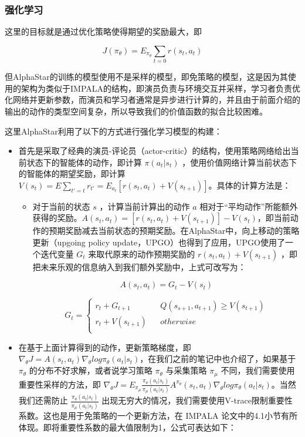 \subsubsection{强化学习} 

这里的目标就是通过优化策略使得期望的奖励最大，即

$$
J(\pi_{\theta}) = E_{\pi_{\theta}} \sum_{t=0}r(s_t,a_t)
$$

但AlphaStar的训练的模型使用不是采样的模型，即免策略的模型，这是因为其使用的架构为类似于IMPALA的结构，即演员负责与环境交互并采样，学习者负责优化网络并更新参数，而演员和学习者通常是异步进行计算的，并且由于前面介绍的输出的动作的类型空间复杂，所以导致我们的价值函数的拟合比较困难。

这里AlphaStar利用了以下的方式进行强化学习模型的构建：
\begin{itemize}
    \item 首先是采取了经典的演员-评论员（actor-critic）的结构，使用策略网络给出当前状态下的智能体的动作，即计算 $\pi(a_t|s_t)$ ，使用价值网络计算当前状态下的智能体的期望奖励，即计算 $V(s_t) = E \sum_{t'=t}r_{t'} = E_{a_t}[r(s_t,a_t)+V(s_{t+1})]$。具体的计算方法是：
    \begin{itemize}
        \item 对于当前的状态 $s$ ，计算当前计算出的动作 $a$ 相对于“平均动作”所能额外获得的奖励。$A(s_t,a_t)=[r(s_t,a_t)+V(s_{t+1})]-V(s_t)$，即当前动作的预期奖励减去当前状态的预期奖励。在AlphaStar中，向上移动的策略更新（upgoing policy update，UPGO）也得到了应用，UPGO使用了一个迭代变量 $G_t$ 来取代原来的动作预期奖励的 $r(s_t,a_t)+V(s_{t+1})$ ，即把未来乐观的信息纳入到我们额外奖励中，上式可改写为：

        $$
        A(s_t,a_t)=G_t-V(s_t)
        $$
        
        $$
        G_t=\left\{
        \begin{aligned}
        r_t+G_{t+1} && Q(s_{s+1},a_{t+1})\geq V(s_{t+1}) \\
        r_t+V(s_{t+1}) && otherwise \\
        \end{aligned}
        \right.
        $$
    \end{itemize}
\item 在基于上面计算得到的动作，更新策略梯度，即 $\nabla_{\theta}J = A(s_t,a_t)\nabla_{\theta}log \pi_{\theta}(a_t|s_t)$，在我们之前的笔记中也介绍了，如果基于 $\pi_{\theta}$ 的分布不好求解，或者说学习策略 $\pi_{\theta}$ 与采集策略 $\pi_{\mu}$ 不同，我们需要使用重要性采样的方法，即 $\nabla_{\theta}J = E_{\pi_{\mu}}\frac{\pi_{\theta} (a_t|s_t)}{\pi_{\mu} (a_t|s_t)} A^{\pi_{\theta}}(s_t,a_t)\nabla_{\theta}log \pi_{\theta}(a_t|s_t)$。当然我们还需防止 $\frac{\pi_{\theta} (a_t|s_t)}{\pi_{\mu} (a_t|s_t)}$ 出现无穷大的情况，我们需要使用V-trace限制重要性系数。这也是用于免策略的一个更新方法，在 IMPALA 论文中的4.1小节有所体现。即将重要性系数的最大值限制为1，公式可表达如下：


\end{itemize}
